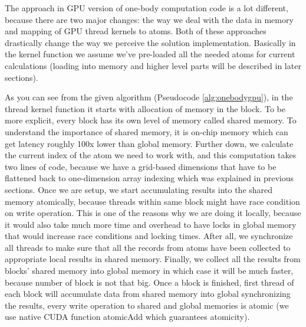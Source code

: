 \documentclass[12pt,letterpaper]{report}
\begin{document}
\noindent\hspace{3em} The approach in GPU version of one-body computation code is a lot different, because there are two major changes: the way we deal with the data in memory and mapping of GPU thread kernels to atoms. Both of these approaches drastically change the way we perceive the solution implementation. Basically in the kernel function we assume we've pre-loaded all the needed atoms for current calculations (loading into memory and higher level parts will be described in later sections).

\noindent\hspace{3em}As you can see from the given algorithm (Pseudocode \ref{alg:onebodygpu}), in the thread kernel function it starts with allocation of memory in the block. To be more explicit, every block has its own level of memory called shared memory. To understand the importance of shared memory, it is on-chip memory which can get latency roughly 100x lower than global memory. Further down, we calculate the current index of the atom we need to work with, and this computation takes two lines of code, because we have a grid-based dimensions that have to be flattened back to one-dimension array indexing which was explained in previous sections. Once we are setup, we start accumulating results into the shared memory atomically, because threads within same block might have race condition on write operation. This is one of the reasons why we are doing it locally, because it would also take much more time and overhead to have locks in global memory that would increase race conditions and locking times. After all, we synchronize all threads to make sure that all the records from atoms have been collected to appropriate local results in shared memory. Finally, we collect all the results from blocks' shared memory into global memory in which case it will be much faster, because number of block is not that big. Once a block is finished, first thread of each block will accumulate data from shared memory into global synchronizing the results, every write operation to shared and global memories is atomic (we use native CUDA function atomicAdd which guarantees atomicity). 
\end{document}
